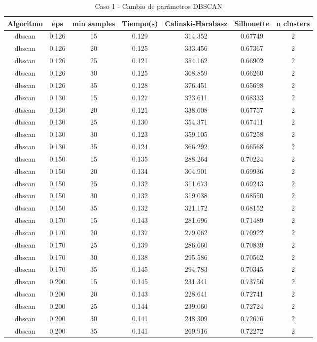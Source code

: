 \begin{table}
\centering
\caption{Caso 1 - Cambio de parámetros DBSCAN}
\label{tab:c1_dbscan}
\begin{tabular}{ccccccc}
\toprule
Algoritmo & eps & min samples & Tiempo(s) & Calinski-Harabasz & Silhouette & n clusters \\
\midrule
dbscan & 0.126 & 15 & 0.129 & 314.352 & 0.67749 & 2 \\
dbscan & 0.126 & 20 & 0.125 & 333.456 & 0.67367 & 2 \\
dbscan & 0.126 & 25 & 0.121 & 354.162 & 0.66902 & 2 \\
dbscan & 0.126 & 30 & 0.125 & 368.859 & 0.66260 & 2 \\
dbscan & 0.126 & 35 & 0.128 & 376.451 & 0.65698 & 2 \\
dbscan & 0.130 & 15 & 0.127 & 323.611 & 0.68333 & 2 \\
dbscan & 0.130 & 20 & 0.121 & 338.608 & 0.67757 & 2 \\
dbscan & 0.130 & 25 & 0.130 & 354.371 & 0.67411 & 2 \\
dbscan & 0.130 & 30 & 0.123 & 359.105 & 0.67258 & 2 \\
dbscan & 0.130 & 35 & 0.124 & 366.292 & 0.66568 & 2 \\
dbscan & 0.150 & 15 & 0.135 & 288.264 & 0.70224 & 2 \\
dbscan & 0.150 & 20 & 0.134 & 304.901 & 0.69936 & 2 \\
dbscan & 0.150 & 25 & 0.132 & 311.673 & 0.69243 & 2 \\
dbscan & 0.150 & 30 & 0.132 & 319.038 & 0.68550 & 2 \\
dbscan & 0.150 & 35 & 0.132 & 321.172 & 0.68152 & 2 \\
dbscan & 0.170 & 15 & 0.143 & 281.696 & 0.71489 & 2 \\
dbscan & 0.170 & 20 & 0.137 & 279.062 & 0.70922 & 2 \\
dbscan & 0.170 & 25 & 0.139 & 286.660 & 0.70839 & 2 \\
dbscan & 0.170 & 30 & 0.138 & 295.586 & 0.70562 & 2 \\
dbscan & 0.170 & 35 & 0.145 & 294.783 & 0.70345 & 2 \\
dbscan & 0.200 & 15 & 0.145 & 231.341 & 0.73756 & 2 \\
dbscan & 0.200 & 20 & 0.143 & 228.641 & 0.72741 & 2 \\
dbscan & 0.200 & 25 & 0.144 & 239.060 & 0.72724 & 2 \\
dbscan & 0.200 & 30 & 0.141 & 248.309 & 0.72676 & 2 \\
dbscan & 0.200 & 35 & 0.141 & 269.916 & 0.72272 & 2 \\
\bottomrule
\end{tabular}
\end{table}


